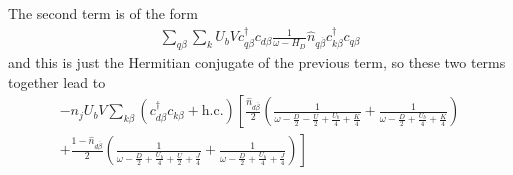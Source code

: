 \documentclass{report}
\numberwithin{equation}{section}
\begin{document}
\begin{appendices}
The second term is of the form
\begin{equation}\begin{aligned}
	\sum_{q\beta}\sum_{k}U_b V c^\dagger_{q\beta}c_{d\beta} \frac{1}{\omega - H_D} \hat n_{q\overline\beta} c^\dagger_{k\beta}c_{q\beta}
\end{aligned}\end{equation}
and this is just the Hermitian conjugate of the previous term, so these two terms together lead to
\begin{equation}\begin{aligned}
	-n_jU_b V\sum_{k\beta} \left(c^\dagger_{d\beta} c_{k\beta} + \text{h.c.}\right) \left[\frac{\hat n_{d\overline\beta}}{2}\left(\frac{1}{\omega - \frac{D}{2} - \frac{U}{2} + \frac{U_b}{4} + \frac{K}{4}} + \frac{1}{\omega - \frac{D}{2} + \frac{U_b}{4} + \frac{K}{4}}\right) \right.\\
	+ \left.\frac{1-\hat n_{d\overline\beta}}{2}\left(\frac{1}{\omega - \frac{D}{2} + \frac{U_b}{4} + \frac{U}{2} + \frac{J}{4}} + \frac{1}{\omega - \frac{D}{2} + \frac{U_b}{4} + \frac{J}{4}}\right)\right]
\end{aligned}\end{equation}


\end{appendices}
\end{document}
